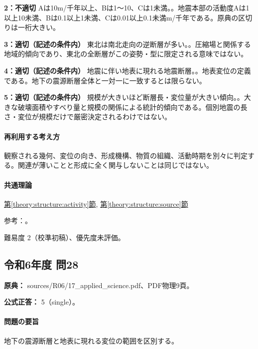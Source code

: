 \noindent\textbf{2：不適切} Aは10m/千年以上、Bは1〜10、Cは1未満。。地震本部の活動度Aは1以上10未満、Bは0.1以上1未満、Cは0.01以上0.1未満m/千年である。原典の区切りは一桁大きい。\par

\noindent\textbf{3：適切（記述の条件内）} 東北は南北走向の逆断層が多い。。圧縮場と関係する地域的傾向であり、東北の全断層がこの姿勢・型に限定される意味ではない。\par

\noindent\textbf{4：適切（記述の条件内）} 地震に伴い地表に現れる地震断層。。地表変位の定義である。地下の震源断層全体と一対一に一致するとは限らない。\par

\noindent\textbf{5：適切（記述の条件内）} 規模が大きいほど断層長・変位量が大きい傾向。。大きな破壊面積やすべり量と規模の関係による統計的傾向である。個別地震の長さ・変位が規模だけで厳密決定されるわけではない。\par

\paragraph{再利用する考え方} 観察される幾何、変位の向き、形成機構、物質の組織、活動時期を別々に判定する。関連が薄いことと形成に全く関与しないことは同じではない。

\paragraph{共通理論} \hyperref[theory:structure:activity]{第\ref*{theory:structure:activity}節}, \hyperref[theory:structure:source]{第\ref*{theory:structure:source}節}

\par 参考：\cite{str_activity,str_source}。

\par 難易度 2（校準初稿）、優先度未評価。

\subsection{令和6年度 問28}
\label{q:r06-reg-applied-28}

\noindent\textbf{原典：} sources/R06/17\_applied\_science.pdf、PDF物理9頁。

\textbf{公式正答：} 5（single）。

\paragraph{問題の要旨} 地下の震源断層と地表に現れる変位の範囲を区別する。

